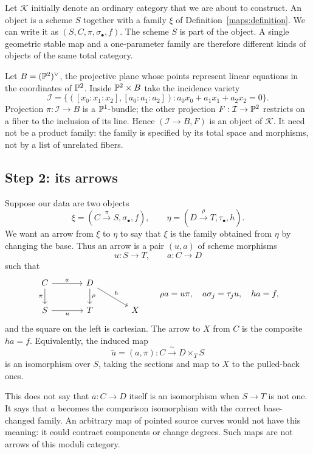 Let $\mathscr K$ initially denote an ordinary category that we are about to construct. An object is a scheme $S$ together with a family $\xi$ of Definition~\ref{maps:definition}. We can write it as $(S,C,\pi,\sigma_\bullet,f)$. The scheme $S$ is part of the object. A single geometric stable map and a one-parameter family are therefore different kinds of objects of the same total category.

\begin{Ex}\label{maps:family-lines}
Let $B=(\mathbb P^2)^\vee$, the projective plane whose points represent linear equations in the coordinates of $\mathbb P^2$. Inside $\mathbb P^2\times B$ take the incidence variety
\[
 \mathcal I=\{([x_0:x_1:x_2],[a_0:a_1:a_2]):a_0x_0+a_1x_1+a_2x_2=0\}.
\]
Projection $\pi:\mathcal I\to B$ is a $\mathbb P^1$-bundle; the other projection $F:\mathcal I\to\mathbb P^2$ restricts on a fiber to the inclusion of its line. Hence $(\mathcal I\to B,F)$ is an object of $\mathscr K$. It need not be a product family: the family is specified by its total space and morphisms, not by a list of unrelated fibers.
\end{Ex}

\subsection{Step 2: its arrows}

Suppose our data are two objects
\[
 \xi=(C\xrightarrow{\pi}S,\sigma_\bullet,f),\qquad
 \eta=(D\xrightarrow{\rho}T,\tau_\bullet,h).
\]
We want an arrow from $\xi$ to $\eta$ to say that $\xi$ is the family obtained from $\eta$ by changing the base. Thus an arrow is a pair $(u,a)$ of scheme morphisms
\[
 u:S\longrightarrow T,\qquad a:C\longrightarrow D
\]
such that
\begin{equation}\label{maps:arrow-square}
\begin{tikzcd}[column sep=large]
 C\arrow[r,"a"]\arrow[d,"\pi"']&D\arrow[d,"\rho"]\arrow[dr,"h"]&\\
 S\arrow[r,"u"']&T&X
\end{tikzcd}
\qquad
 \rho a=u\pi,\quad a\sigma_j=\tau_j u,\quad ha=f,
\end{equation}
and the square on the left is cartesian. The arrow to $X$ from $C$ is the composite $ha=f$. Equivalently, the induced map
\[
 \widetilde a=(a,\pi):C\xrightarrow{\ \sim\ }D\times_T S
\]
is an isomorphism over $S$, taking the sections and map to $X$ to the pulled-back ones.

This does not say that $a:C\to D$ itself is an isomorphism when $S\to T$ is not one. It says that $a$ becomes the comparison isomorphism with the correct base-changed family. An arbitrary map of pointed source curves would not have this meaning: it could contract components or change degrees. Such maps are not arrows of this moduli category.

